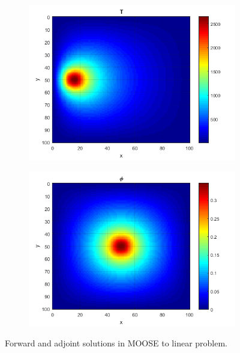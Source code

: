 \documentclass{article}
\begin{document}
\begin{figure}[H]
\label{sol1}
\centering
\begin{subfigure}{.5\textwidth}
  \centering
  \includegraphics[width=.98\linewidth]{linearT.png}
  \label{fig:sfig1}
\end{subfigure}%
\begin{subfigure}{.5\textwidth}
  \centering
  \includegraphics[width=.98\linewidth]{linearphi.png}
  \label{fig:sfig4}
\end{subfigure}%
\caption{Forward and adjoint solutions in MOOSE to linear problem.}
\end{figure}
\end{document}
